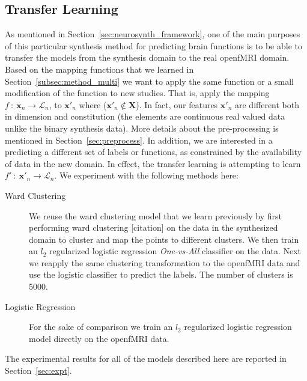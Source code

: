\documentclass{article} %
\begin{document}
 \subsection{Transfer Learning}
 As mentioned in Section~\ref{sec:neurosynth_framework}, one of the main purposes of this particular synthesis method for predicting brain functions is to be able to transfer the models from the synthesis domain to the real openfMRI domain. Based on the mapping functions that we learned in Section~\ref{subsec:method_multi} we want to apply the same function or a small modification of the function to new studies. That is, apply the mapping $f\ :\ \mathbf{x}_n \rightarrow \mathcal{L}_n$, to $\mathbf{x}'_n$ where ($\mathbf{x}'_n \notin \mathbf{X}$). In fact, our features $\mathbf{x}'_n$ are different both in dimension and constitution (the elements are continuous real valued data unlike the binary synthesis data). More details about the pre-processing is mentioned in Section~\ref{sec:preprocess}. In addition, we are interested in a predicting a different set of labels or functions, as constrained by the availability of data in the new domain. In effect, the transfer learning is attempting to learn $f'\ :\ \mathbf{x}'_n \rightarrow \mathcal{L}_n$. We experiment with the following methods here:
  \begin{description}
  \item[Ward Clustering] We reuse the ward clustering model that we learn previously by first performing ward clustering [citation] on the data in the synthesized domain to cluster and map the points to different clusters. We then train an $l_2$ regularized logistic regression \textit{One-vs-All} classifier on the data. Next we reapply the same clustering transformation to the openfMRI data and use the logistic classifier to predict the labels. The number of clusters is 5000.
  \item[Logistic Regression] For the sake of comparison we train an $l_2$ regularized logistic regression model directly on the openfMRI data.
  \end{description}
The experimental results for all of the models described here are reported in Section~\ref{sec:expt}.
\end{document}
